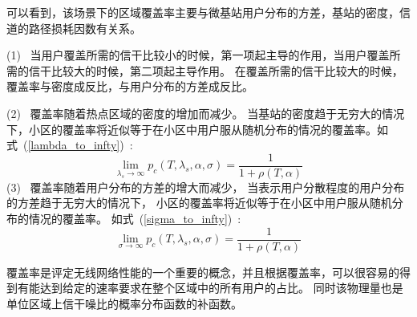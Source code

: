 可以看到，该场景下的区域覆盖率主要与微基站用户分布的方差，基站的密度，信道的路径损耗因数有关系。

(1) ~当用户覆盖所需的信干比较小的时候，第一项起主导的作用，当用户覆盖所需的信干比较大的时候，第二项起主导作用。
在覆盖所需的信干比较大的时候，覆盖率与密度成反比，与用户分布的方差成反比。

(2) ~覆盖率随着热点区域的密度的增加而减少。
当基站的密度趋于无穷大的情况下，小区的覆盖率将近似等于在小区中用户服从随机分布的情况的覆盖率。如式~(\ref{lambda_to_infty})~:
\begin{equation}\label{lambda_to_infty}
  \lim_{\lambda_s \rightarrow \infty} p_c(T,\lambda_s,\alpha,\sigma) = \frac{1}{1+\rho(T, \alpha)}
\end{equation}
(3) ~覆盖率随着用户分布的方差的增大而减少，
当表示用户分散程度的用户分布的方差趋于无穷大的情况下，
小区的覆盖率将近似等于在小区中用户服从随机分布的情况的覆盖率。
如式~(\ref{sigma_to_infty})~:
\begin{equation}\label{sigma_to_infty}
  \lim_{\sigma \rightarrow \infty} p_c(T,\lambda_s,\alpha,\sigma) = \frac{1}{1+\rho(T, \alpha)}
\end{equation}

覆盖率是评定无线网络性能的一个重要的概念，并且根据覆盖率，可以很容易的得到有能达到给定的速率要求在整个区域中的所有用户的占比。
同时该物理量也是单位区域上信干噪比的概率分布函数的补函数。

